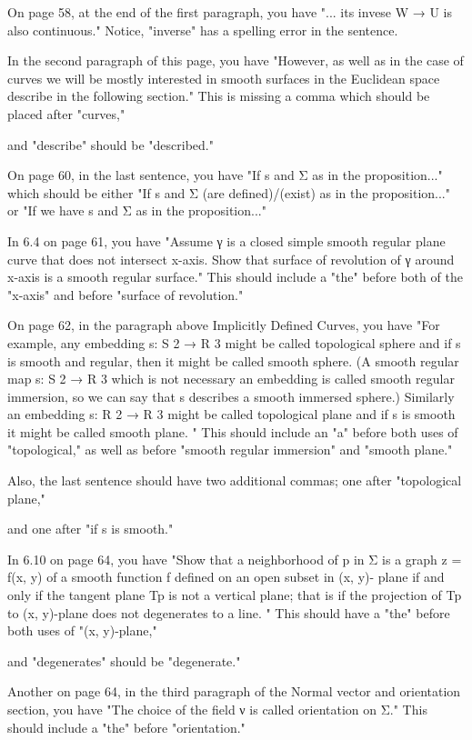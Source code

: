  On page 58, at the end of the first paragraph, you have "... its invese W → U is also continuous." Notice, "inverse" has a spelling error in the sentence. 
 
 In the second paragraph of this page, you have "However, as well as in the case of curves we will be mostly interested in smooth surfaces in the Euclidean space describe in the following section." This is missing a comma which should be placed after "curves," 
 
 and "describe" should be "described." 
 
 On page 60, in the last sentence, you have "If s and Σ as in the proposition..." which should be either "If s and Σ (are defined)/(exist) as in the proposition..." or "If we have s and Σ as in the proposition..." 
 
 In 6.4 on page 61, you have "Assume γ is a closed simple smooth regular plane curve that does not intersect x-axis. Show that surface of revolution of γ around x-axis is a smooth regular surface." This should include a "the" before both of the "x-axis" and before "surface of revolution." 
 
 On page 62, in the paragraph above Implicitly Defined Curves, you have "For example, any embedding s: S 2 → R 3 might be called topological sphere and if s is smooth and regular, then it might be called smooth sphere. (A smooth regular map s: S 2 → R 3 which is not necessary an embedding is called smooth regular immersion, so we can say that s describes a smooth immersed sphere.) Similarly an embedding s: R 2 → R 3 might be called topological plane and if s is smooth it might be called smooth plane. " This should include an "a" before both uses of "topological," as well as before "smooth regular immersion" and "smooth plane." 
 
 Also, the last sentence should have two additional commas; one after "topological plane," 
 
 and one after "if s is smooth." 
 
 In 6.10 on page 64, you have "Show that a neighborhood of p in Σ is a graph z = f(x, y) of a smooth function f defined on an open subset in (x, y)- plane if and only if the tangent plane Tp is not a vertical plane; that is if the projection of Tp to (x, y)-plane does not degenerates to a line. " 
 This should have a "the" before both uses of "(x, y)-plane," 
 
 and "degenerates" should be "degenerate." 
 
 Another on page 64, in the third paragraph of the Normal vector and orientation section, you have "The choice of the field ν is called orientation on Σ." This should include a "the" before "orientation." 
 
